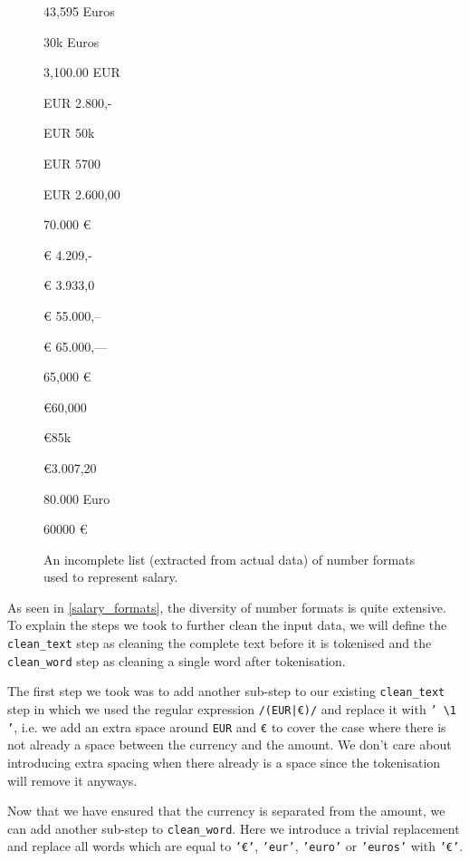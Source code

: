 \documentclass[runningheads]{llncs}
\begin{document}
\begin{figure}
	\centering

  \begin{multicols}{3}
    \begin{description}
      \item 43,595 Euros
      \item 30k Euros
      \item 3,100.00 EUR
      \item EUR 2.800,-
      \item EUR 50k
      \item EUR 5700
      \item EUR 2.600,00
      \item 70.000 €
      \item € 4.209,-
      \item € 3.933,0
      \item € 55.000,--
      \item € 65.000,---
      \item 65,000 €
      \item €60,000
      \item €85k
      \item €3.007,20
      \item 80.000 Euro
      \item 60000 €
    \end{description}
  \end{multicols}
  \caption{An incomplete list (extracted from actual data) of number formats used to represent salary.}
  \label{salary_formats}
\end{figure}

As seen in \autoref{salary_formats}, the diversity of number formats is quite extensive. To explain the steps we took to further clean the input data, we will define the \texttt{clean\_text} step as cleaning the complete text before it is tokenised and the \texttt{clean\_word} step as cleaning a single word after tokenisation.

The first step we took was to add another sub-step to our existing \texttt{clean\_text} step in which we used the regular expression \texttt{/(EUR|€)/} and replace it with \texttt{' \textbackslash1 '}, i.e. we add an extra space around \texttt{EUR} and \texttt{€} to cover the case where there is not already a space between the currency and the amount. We don't care about introducing extra spacing when there already is a space since the tokenisation will remove it anyways.

Now that we have ensured that the currency is separated from the amount, we can add another sub-step to \texttt{clean\_word}. Here we introduce a trivial replacement and replace all words which are equal to \texttt{'€'}, \texttt{'eur'}, \texttt{'euro'} or \texttt{'euros'} with \texttt{'€'}.
\end{document}

